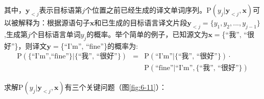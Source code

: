 \vspace{-0.5em}
\noindent 其中，$ \mathbf{y}_{<j }$表示目标语第$j$个位置之前已经生成的译文单词序列。$\textrm{P} ( y_j | \mathbf{y}_{<j }, \mathbf{x})$可以被解释为：根据源语句子$\mathbf{x} $和已生成的目标语言译文片段$\mathbf{y}_{<j }=\{ y_1, y_2,..., y_{j-1} \}$,生成第$j$个目标语言单词$y_j$的概率。举个简单的例子，已知源文为$\mathbf{x} =$\{\textrm{``我'', ``很好''}\}，则译文$\mathbf{y}=$\{``I’m'', ``fine''\}的概率为:
\begin{eqnarray}
\textrm{P} ( \{{\textrm{``I'm'',``fine''}}\}|\{\textrm{``我'', ``很好''}\}) & = & \textrm{P} (\textrm{``I'm''}| \{\textrm{``我'', ``很好''}\} ) \cdot \nonumber \\
                                                                            &   & \textrm{P} (\textrm{``fine''}|\textrm{``I'm''},\{\textrm{``我'', ``很好''}\})
\label{eq:6-3}
\end{eqnarray}

\parinterval 求解$\textrm{P}(y_j | \mathbf{y}_{<j},\mathbf{x})$有三个关键问题（图\ref{fig:6-11}）：

